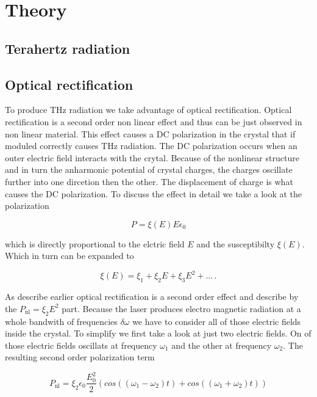 \chapter{Theory}
\section{Terahertz radiation}

\section{Optical rectification}\label{sec:optic_ref}
To produce $\si{\tera\hertz}$ radiation we take advantage of optical rectification.
Optical rectification is a second order non linear effect and thus can be just observed in non linear material.
This effect causes a DC polarization in the crystal that if moduled correctly causes $\si{\tera\hertz}$ radiation.
The DC polarization occurs when an outer electric field interacts with the crytal.
Because of the nonlinear structure and in turn the anharmonic potential of crystal charges, the charges oscillate further into one dircetion then the other.
The displacement of charge is what causes the DC polarization.
To discuss the effect in detail we take a look at the polarization

\begin{equation}
P = \xi(E) E \epsilon_0
\end{equation}

which is directly proportional to the elctric field $E$ and the susceptibilty $\xi(E)$.
Which in turn can be expanded to 

\begin{equation}
    \xi(E) = \xi_1 + \xi_2 E +\xi_3 E^2 + ...   \, .
\end{equation}

As describe earlier optical rectification is a second order effect and describe by the $P_\text{nl} = \xi_2 E^2$ part.
Because the laser produces electro magnetic radiation at a whole bandwith of frequencies $\delta\omega$ we have to consider all of those electric fields inside the crystal.
To simplify we first take a look at just two electric fields.
On of those electric fields oscillats at frequency $\omega_1$ and the other at frequency $\omega_2$.
The resulting second order polarization term 

\begin{equation}
    P_\text{nl} = \xi_2 \epsilon_0 \frac{E_0^2}{2}\left(cos((\omega_1 - \omega_2)t) + cos((\omega_1 + \omega_2)t)\right)
\end{equation}


